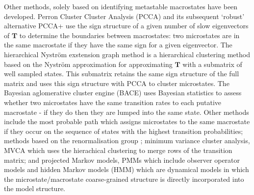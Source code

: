 \begin{highlighted}
Other methods, solely based on identifying metastable macrostates have been developed. Perron Cluster Cluster Analysis (PCCA) \cite{deuflhardIdentificationAlmostInvariant2000a} and its subsequent `robust' alternative PCCA+ \cite{deuflhardRobustPerronCluster2005b} use the sign structure of a given number of slow eigenvectors of $\mathbf{T}$ to determine the boundaries between macrostates: two microstates are in the same macrostate if they have the same sign for a given eigenvector.  The hierarchical Nystr{\"o}m exstension graph method is a hierarchical clustering method based on the Nystr{\"o}m approximation for approximating $\mathbf{T}$ \cite{yaoHierarchicalNystromMethods2013a} with a submatrix of well sampled states. This submatrix retains the same sign structure of the full matrix and uses this sign structure with PCCA to cluster microstates. The Bayesian aglomerative cluster engine (BACE) \cite{bowmanImprovedCoarsegrainingMarkov2012a} uses Bayesian statistics to assess whether two microstates have the same transition rates to each putative macrostate - if they do then they are lumped into the same state. Other methods include the most probable path \cite{jainIdentifyingMetastableStates2012a} which assigns microstates to the same macrostate if they occur on the sequence of states with the highest transition probabilities; methods based on the renormalisation group \cite{orioliDimensionalReductionMarkov2016c};  minimum variance cluster analysis, MVCA \cite{husicMinimumVarianceClustering2018} which uses the hierachical clustering to merge rows of the transition matrix; and projected Markov models, PMMs \cite{noeProjectedHiddenMarkov2013a} which include observer operator models \cite{wuProjectedMetastableMarkov2015} and hidden Markov models \cite{noeProjectedHiddenMarkov2013a} (HMM) which are dynamical models in which the microstate/macrostate coarse-grained structure is directly incorporated into the model structure. 


\end{highlighted}
